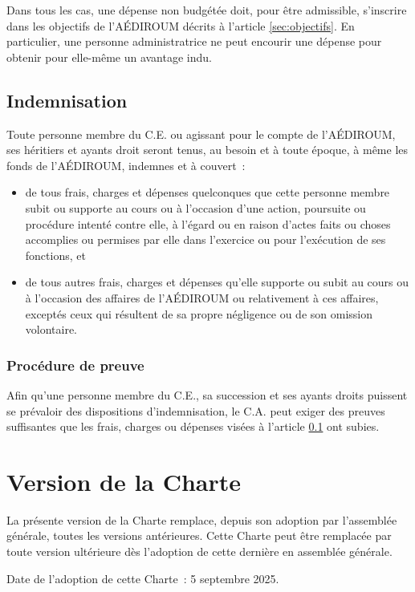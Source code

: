 \documentclass{aediroum}
\newcommand{\article}[1]{article \ref{#1}}
\begin{document}
Dans tous les cas, une dépense non budgétée doit, pour être admissible, s'inscrire dans les objectifs de l'AÉDIROUM décrits à l'\article{sec:objectifs}. En particulier, une personne administratrice ne peut encourir une dépense pour obtenir pour elle-même un avantage indu.

\subsection{Indemnisation}\label{sec:indemnisation}

Toute personne membre du C.E. ou agissant pour le compte de l’AÉDIROUM, ses héritiers et ayants droit seront tenus, au besoin et à toute époque, à même les fonds de l'AÉDIROUM, indemnes et à couvert~:

\begin{itemize}
    \item de tous frais, charges et dépenses quelconques que cette personne membre subit ou supporte au cours ou à l'occasion d'une action, poursuite ou procédure intenté contre elle, à l'égard ou en raison d'actes faits ou choses accomplies ou permises par elle dans l'exercice ou pour l'exécution de ses fonctions, et
    \item de tous autres frais, charges et dépenses qu'elle supporte ou subit au cours ou à l'occasion des affaires de l'AÉDIROUM ou relativement à ces affaires, exceptés ceux qui résultent de sa propre négligence ou de son omission volontaire.
\end{itemize}

\subsubsection{Procédure de preuve}\label{sec:procedure-de-preuve}

Afin qu'une personne membre du C.E., sa succession et ses ayants droits puissent se prévaloir des dispositions d'indemnisation, le C.A. peut exiger des preuves suffisantes que les frais, charges ou dépenses visées à l'\article{sec:indemnisation} ont subies.

\section{Version de la Charte}\label{sec:version-de-la-Charte}

La présente version de la Charte remplace, depuis son adoption par l'assemblée générale, toutes les versions antérieures. Cette Charte peut être remplacée par toute version ultérieure dès l'adoption de cette dernière en assemblée générale.

Date de l'adoption de cette Charte~: 5 septembre 2025.
\end{document}
